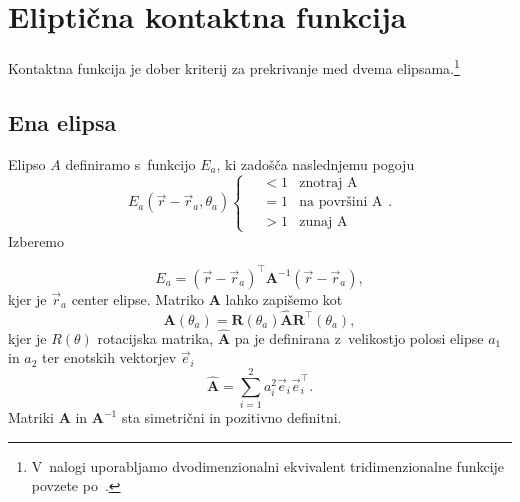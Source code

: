 \section{Eliptična kontaktna funkcija}

Kontaktna funkcija je dober kriterij za prekrivanje med dvema elipsama.\footnote{V~nalogi
uporabljamo dvodimenzionalni ekvivalent tridimenzionalne funkcije povzete 
po~\cite{perram1985}.}

\subsection{Ena elipsa}
Elipso $A$ definiramo s~funkcijo $E_a$, ki zadošča naslednjemu pogoju
\begin{equation}
    E_a (\vec{r}-\vec{r}_a, \theta_a) 
    \begin{cases}
        \quad <1 & \text{znotraj A}\\
        \quad =1 & \text{na površini A}\\
        \quad >1 & \text{zunaj A}
      \end{cases}. 
    \label{eq:cases}
\end{equation}
Izberemo

\begin{equation}
    E_a = (\vec{r} - \vec{r}_a)^{\top} \mathbf{A}^{-1} (\vec{r} - \vec{r}_a),
\label{eq:elipsa}
\end{equation}
kjer je $\vec{r}_a$ center elipse. Matriko $\mathbf{A}$ lahko zapišemo kot
\begin{equation}
    \mathbf{A} (\theta_a) = \mathbf{R}(\theta_a) \hat{\mathbf{A}} 
                            \mathbf{R}^{\top}(\theta_a),
\end{equation}
kjer je $R(\theta)$ rotacijska matrika, $\hat{\mathbf{A}}$ pa je definirana z~velikostjo 
polosi elipse $a_1$ in $a_2$ ter enotskih vektorjev $\vec{e}_i$ 
\begin{equation}
    \hat{\mathbf{A}} = \sum_{i=1}^{2} a_i^2 \vec{e}_i \vec{e}_i^{\top}.
\end{equation}
Matriki $\mathbf{A}$ in $\mathbf{A}^{-1}$ sta simetrični in pozitivno definitni.

